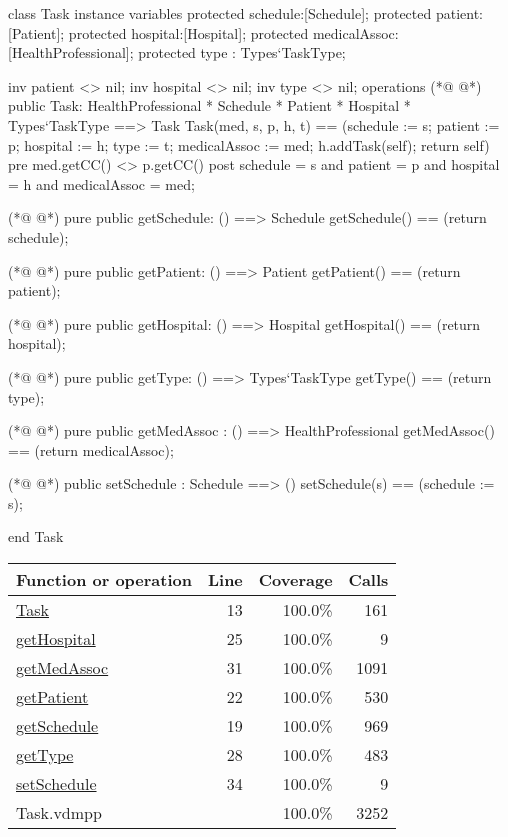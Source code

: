 \begin{vdmpp}[breaklines=true]
class Task
instance variables
  protected schedule:[Schedule];
  protected patient:[Patient];
  protected hospital:[Hospital];
  protected medicalAssoc:[HealthProfessional];
  protected type : Types`TaskType;
  
  inv patient <> nil;
  inv hospital <> nil;
  inv type <> nil;
operations
(*@
\label{Task:13}
@*)
 public Task: HealthProfessional * Schedule * Patient * Hospital * Types`TaskType ==> Task
  Task(med, s, p, h, t) == (schedule := s; patient := p; hospital := h; type := t; medicalAssoc := med; 
             h.addTask(self); return self)
 pre med.getCC() <> p.getCC()
 post schedule = s and patient = p and hospital = h and medicalAssoc = med;
 
(*@
\label{getSchedule:19}
@*)
 pure public getSchedule: () ==> Schedule
  getSchedule() == (return schedule);
  
(*@
\label{getPatient:22}
@*)
 pure public getPatient: () ==> Patient
  getPatient() == (return patient);
  
(*@
\label{getHospital:25}
@*)
 pure public getHospital: () ==> Hospital
  getHospital() == (return hospital);
  
(*@
\label{getType:28}
@*)
 pure public getType: () ==> Types`TaskType
  getType() == (return type);
  
(*@
\label{getMedAssoc:31}
@*)
 pure public getMedAssoc : () ==> HealthProfessional
  getMedAssoc() == (return medicalAssoc);
  
(*@
\label{setSchedule:34}
@*)
 public setSchedule : Schedule ==> ()
  setSchedule(s) == (schedule := s);

end Task
\end{vdmpp}
\bigskip
\begin{longtable}{|l|r|r|r|}
\hline
Function or operation & Line & Coverage & Calls \\
\hline
\hline
\hyperref[Task:13]{Task} & 13&100.0\% & 161 \\
\hline
\hyperref[getHospital:25]{getHospital} & 25&100.0\% & 9 \\
\hline
\hyperref[getMedAssoc:31]{getMedAssoc} & 31&100.0\% & 1091 \\
\hline
\hyperref[getPatient:22]{getPatient} & 22&100.0\% & 530 \\
\hline
\hyperref[getSchedule:19]{getSchedule} & 19&100.0\% & 969 \\
\hline
\hyperref[getType:28]{getType} & 28&100.0\% & 483 \\
\hline
\hyperref[setSchedule:34]{setSchedule} & 34&100.0\% & 9 \\
\hline
\hline
Task.vdmpp & & 100.0\% & 3252 \\
\hline
\end{longtable}

